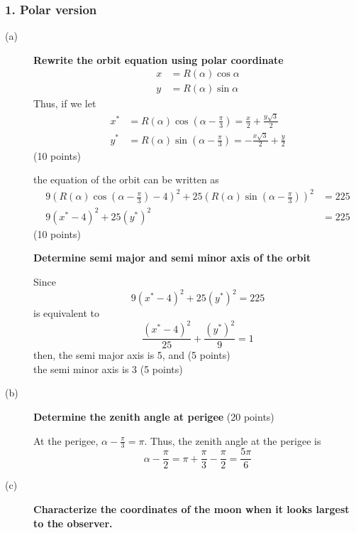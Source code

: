 \subsubsection*{1. Polar version}

\begin{description}
\item[(a)] \textbf{Rewrite the orbit equation using polar coordinate}
  \begin{align*}
    x &= R(\alpha)\cos\alpha \\
    y &= R(\alpha)\sin\alpha
  \end{align*}
  Thus, if we let
  \begin{align*}
    x^* &= R(\alpha)\cos\left(\alpha - \frac{\pi}{3}\right)
      = \frac{x}{2} + \frac{y\sqrt{3}}{2} \\
    y^* &= R(\alpha)\sin\left(\alpha - \frac{\pi}{3}\right)
      = -\frac{x\sqrt{3}}{2} + \frac{y}{2}
  \end{align*}
  \hfill(10 points)

  the equation of the orbit can be written as
  \begin{align*}
    9\left(R(\alpha)\cos\left(\alpha - \frac{\pi}{3}\right) - 4\right)^2
      + 25\left(R(\alpha)\sin\left(\alpha - \frac{\pi}{3}\right)\right)^2
      &= 225 \\
    9(x^* - 4)^2 + 25(y^*)^2 &= 225
  \end{align*}
  \hfill(10 points)

  \textbf{Determine semi major and semi minor axis of the orbit}

  Since
  \[
    9(x^* - 4)^2 + 25(y^*)^2 = 225
  \]
  is equivalent to
  \[
    \frac{(x^* - 4)^2}{25} + \frac{(y^*)^2}{9} = 1
  \]
  then, the semi major axis is 5, and \hfill(5 points) \\
  the semi minor axis is 3 \hfill(5 points)

\item[(b)] \textbf{Determine the zenith angle at perigee} \hfill(20 points)

  At the perigee, $\alpha - \frac{\pi}{3} = \pi$. Thus, the zenith angle at
  the perigee is
  \[
    \alpha - \frac{\pi}{2} = \pi + \frac{\pi}{3} - \frac{\pi}{2}
      = \frac{5\pi}{6}
  \]


\item[(c)] \textbf{Characterize the coordinates of the moon when it looks
  largest to the observer.}


\end{description}
